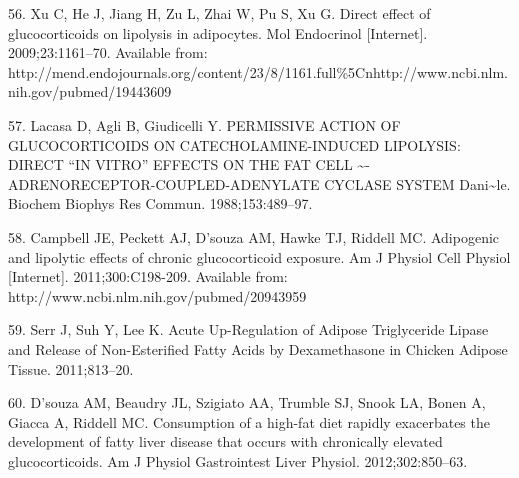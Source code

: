 \documentclass[11pt]{article} %
\begin{document}
56. Xu C, He J, Jiang H, Zu L, Zhai W, Pu S, Xu G. Direct effect of
glucocorticoids on lipolysis in adipocytes. Mol Endocrinol
{[}Internet{]}. 2009;23:1161--70. Available from:
http://mend.endojournals.org/content/23/8/1161.full\%5Cnhttp://www.ncbi.nlm.nih.gov/pubmed/19443609

57. Lacasa D, Agli B, Giudicelli Y. PERMISSIVE ACTION OF GLUCOCORTICOIDS
ON CATECHOLAMINE-INDUCED LIPOLYSIS: DIRECT ``IN VITRO'' EFFECTS ON THE
FAT CELL \textasciitilde{}-ADRENORECEPTOR-COUPLED-ADENYLATE CYCLASE
SYSTEM Dani\textasciitilde{}le. Biochem Biophys Res Commun.
1988;153:489--97.

58. Campbell JE, Peckett AJ, D'souza AM, Hawke TJ, Riddell MC.
Adipogenic and lipolytic effects of chronic glucocorticoid exposure. Am
J Physiol Cell Physiol {[}Internet{]}. 2011;300:C198-209. Available
from: http://www.ncbi.nlm.nih.gov/pubmed/20943959

59. Serr J, Suh Y, Lee K. Acute Up-Regulation of Adipose Triglyceride
Lipase and Release of Non-Esterified Fatty Acids by Dexamethasone in
Chicken Adipose Tissue. 2011;813--20.

60. D'souza AM, Beaudry JL, Szigiato AA, Trumble SJ, Snook LA, Bonen A,
Giacca A, Riddell MC. Consumption of a high-fat diet rapidly exacerbates
the development of fatty liver disease that occurs with chronically
elevated glucocorticoids. Am J Physiol Gastrointest Liver Physiol.
2012;302:850--63.
\end{document}
